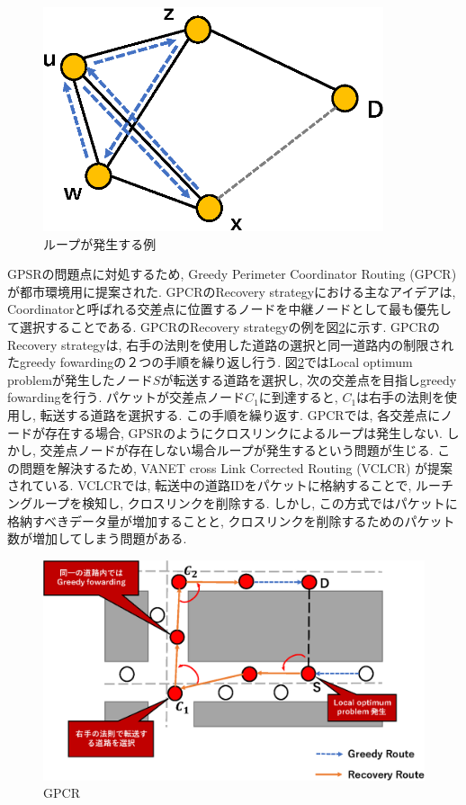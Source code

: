 \documentclass[10pt]{jreport}
\begin{document}
\begin{figure}[!ht]
	\centering
	\includegraphics[width=100mm]{figures/cross-link.eps}
	\caption{ループが発生する例}
	\label{fig:cross_link}
\end{figure}

GPSRの問題点に対処するため, Greedy Perimeter Coordinator Routing (GPCR)\cite{7}が都市環境用に提案された. GPCRのRecovery strategyにおける主なアイデアは, Coordinatorと呼ばれる交差点に位置するノードを中継ノードとして最も優先して選択することである. GPCRのRecovery strategyの例を図\ref{fig:GPCR}に示す.
GPCRのRecovery strategyは, 右手の法則を使用した道路の選択と同一道路内の制限されたgreedy fowardingの２つの手順を繰り返し行う. 図\ref{fig:GPCR}ではLocal optimum problemが発生したノード$S$が転送する道路を選択し, 次の交差点を目指しgreedy fowardingを行う. パケットが交差点ノード$C_{1}$に到達すると, $C_{1}$は右手の法則を使用し, 転送する道路を選択する. この手順を繰り返す. GPCRでは, 各交差点にノードが存在する場合, GPSRのようにクロスリンクによるループは発生しない. しかし, 交差点ノードが存在しない場合ループが発生するという問題が生じる. この問題を解決するため, VANET cross Link Corrected Routing (VCLCR) \cite{29} が提案されている. VCLCRでは, 転送中の道路IDをパケットに格納することで, ルーチングループを検知し, クロスリンクを削除する. しかし, この方式ではパケットに格納すべきデータ量が増加することと, クロスリンクを削除するためのパケット数が増加してしまう問題がある. 

\begin{figure}[!ht]
	\centering
	\includegraphics[width=130mm]{figures/GPCR.eps}
	\caption{GPCR}
	\label{fig:GPCR}
\end{figure}
\end{document}

